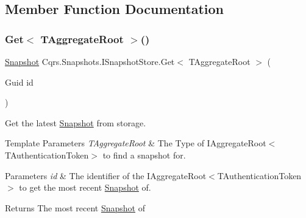 \subsection{Member Function Documentation}
\mbox{\label{interfaceCqrs_1_1Snapshots_1_1ISnapshotStore_ab7bd163fc9cd5c3bd5911679030be403_ab7bd163fc9cd5c3bd5911679030be403}} 
\subsubsection{\texorpdfstring{Get$<$ T\+Aggregate\+Root $>$()}{Get< TAggregateRoot >()}}
{\footnotesize\ttfamily \hyperlink{classCqrs_1_1Snapshots_1_1Snapshot}{Snapshot} Cqrs.\+Snapshots.\+I\+Snapshot\+Store.\+Get$<$ T\+Aggregate\+Root $>$ (\begin{DoxyParamCaption}\item[{Guid}]{id }\end{DoxyParamCaption})}



Get the latest \hyperlink{classCqrs_1_1Snapshots_1_1Snapshot}{Snapshot} from storage. 


\begin{DoxyTemplParams}{Template Parameters}
{\em T\+Aggregate\+Root} & The Type of I\+Aggregate\+Root$<$\+T\+Authentication\+Token$>$ to find a snapshot for.\\
\hline
\end{DoxyTemplParams}

\begin{DoxyParams}{Parameters}
{\em id} & The identifier of the I\+Aggregate\+Root$<$\+T\+Authentication\+Token$>$ to get the most recent \hyperlink{classCqrs_1_1Snapshots_1_1Snapshot}{Snapshot} of.\\
\hline
\end{DoxyParams}
\begin{DoxyReturn}{Returns}
The most recent \hyperlink{classCqrs_1_1Snapshots_1_1Snapshot}{Snapshot} of
\end{DoxyReturn}
\mbox{\label{interfaceCqrs_1_1Snapshots_1_1ISnapshotStore_a6e99c620115ce8a0648a83bf2ce05527_a6e99c620115ce8a0648a83bf2ce05527}} 
